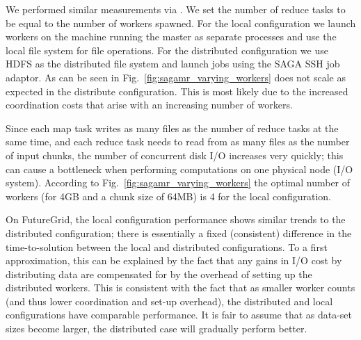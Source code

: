 \documentclass[3p,twocolumn]{elsarticle}
\begin{document}
 
We performed similar measurements via \sagamapreduce.  We set the
number of reduce tasks to be equal to the number of workers spawned.
For the local configuration we launch workers on the machine running
the master as separate processes and use the local file system for
file operations.  For the distributed configuration we use HDFS as the
distributed file system and launch jobs using the SAGA SSH job
adaptor. As can be seen in Fig.~\ref{fig:sagamr_varying_workers}
\sagamapreduce does not scale as expected in the distribute
configuration.  This is most likely due to the increased coordination
costs that arise with an increasing number of workers.

Since each map task writes as many files as the number of reduce tasks
at the same time, and each reduce task needs to read from as many
files as the number of input chunks, the number of concurrent disk I/O
increases very quickly; this can cause a bottleneck when performing
computations on one physical node (I/O system).  According to
Fig.~\ref{fig:sagamr_varying_workers} the optimal number of workers
(for 4GB and a chunk size of 64MB) is 4 for the local configuration.
 
On FutureGrid, the local configuration performance shows similar
trends to the distributed configuration; there is essentially a fixed
(consistent) difference in the time-to-solution between the local and
distributed configurations. To a first approximation, this can be
explained by the fact that any gains in I/O cost by distributing data
are compensated for by the overhead of setting up the distributed
workers. This is consistent with the fact that as smaller worker
counts (and thus lower coordination and set-up overhead), the
distributed and local configurations have comparable performance.  It
is fair to assume that as data-set sizes become larger, the
distributed case will gradually perform better. %
\end{document}
